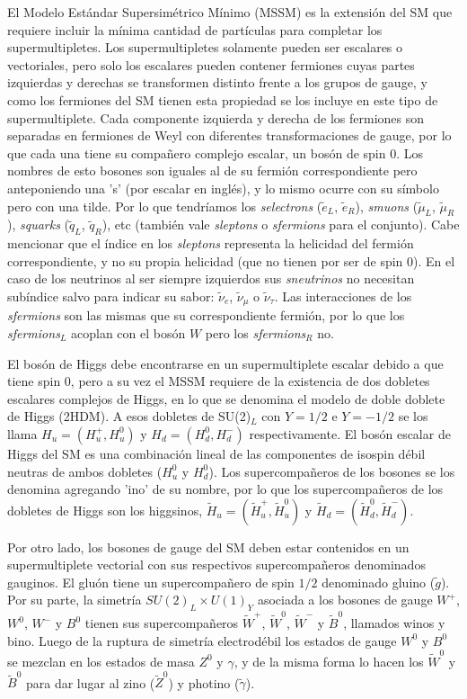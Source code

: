 El Modelo Estándar Supersimétrico Mínimo (MSSM) es la extensión del SM que requiere incluir la mínima cantidad de partículas para completar los supermultipletes. Los supermultipletes solamente pueden ser escalares o vectoriales, pero solo los escalares pueden contener fermiones cuyas partes izquierdas y derechas se transformen distinto frente a los grupos de gauge, y como los fermiones del SM tienen esta propiedad se los incluye en este tipo de supermultiplete. Cada componente izquierda y derecha de los fermiones son separadas en fermiones de Weyl con diferentes transformaciones de gauge, por lo que cada una tiene su compañero complejo escalar, un bosón de spin 0. Los nombres de esto bosones son iguales al de su fermión correspondiente pero anteponiendo una 's' (por escalar en inglés), y lo mismo ocurre con su símbolo pero con una tilde. Por lo que tendríamos los \textit{selectrons} ($\tilde{e}_L$, $\tilde{e}_R$), \textit{smuons} ($\tilde{\mu}_L$, $\tilde{\mu}_R$), \textit{squarks} ($\tilde{q}_L$, $\tilde{q}_R$), etc (también vale \textit{sleptons} o \textit{sfermions} para el conjunto). Cabe mencionar que el índice en los \textit{sleptons} representa la helicidad del fermión correspondiente, y no su propia helicidad (que no tienen por ser de spin 0). En el caso de los neutrinos al ser siempre izquierdos sus \textit{sneutrinos} no necesitan subíndice salvo para indicar su sabor: $\tilde{\nu}_e$, $\tilde{\nu}_{\mu}$ o $\tilde{\nu}_{\tau}$. Las interacciones de los \textit{sfermions} son las mismas que su correspondiente fermión, por lo que los \textit{sfermions}$_L$ acoplan con el bosón $W$ pero los \textit{sfermions}$_R$ no.

El bosón de Higgs debe encontrarse en un supermultiplete escalar debido a que tiene spin 0, pero a su vez el MSSM requiere de la existencia de dos dobletes escalares complejos de Higgs, en lo que se denomina el modelo de doble doblete de Higgs (2HDM). A esos dobletes de SU(2)$_L$ con $Y=1/2$ e $Y=-1/2$ se los llama $H_u=(H_u^+, H_u^0)$ y $H_d=(H_d^0, H_d^-)$ respectivamente. El bosón escalar de Higgs del SM es una combinación lineal de las componentes de isospin débil neutras de ambos dobletes ($H_u^0$ y $H_d^0$). Los supercompañeros de los bosones se los denomina agregando 'ino' de su nombre, por lo que los supercompañeros de los dobletes de Higgs son los higgsinos, $\widetilde{H}_u=(\widetilde{H}_u^+, \widetilde{H}_u^0)$ y $\widetilde{H}_d=(\widetilde{H}_d^0, \widetilde{H}_d^-)$.

Por otro lado, los bosones de gauge del SM deben estar contenidos en un supermultiplete vectorial con sus respectivos supercompañeros denominados gauginos. El gluón tiene un supercompañero de spin $1/2$ denominado gluino ($\tilde{g}$). Por su parte, la simetría $SU(2)_L\times U(1)_Y$ asociada a los bosones de gauge $W^+$, $W^0$, $W^-$ y $B^0$ tienen sus supercompañeros $\widetilde{W}^+$, $\widetilde{W}^0$, $\widetilde{W}^-$ y $\tilde{B}^0$, llamados winos y bino. Luego de la ruptura de simetría electrodébil los estados de gauge $W^0$ y $B^0$ se mezclan en los estados de masa $Z^0$ y $\gamma$, y de la misma forma lo hacen los $\widetilde{W}^0$ y $\widetilde{B}^0$ para dar lugar al zino ($\widetilde{Z}^0$) y photino ($\tilde{\gamma}$).

